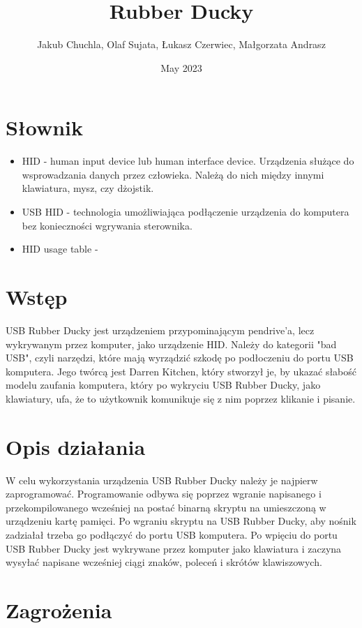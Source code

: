 \documentclass{article}
\title{Rubber Ducky}
\author{Jakub Chuchla, Olaf Sujata, Łukasz Czerwiec, Małgorzata Andrasz}
\date{May 2023}
\begin{document}
\maketitle

\tableofcontents

\section{Słownik}

\begin{itemize}
    \item HID - human input device lub human interface device. Urządzenia służące do wsprowadzania danych przez człowieka. Należą do nich między innymi klawiatura, mysz, czy dżojstik.
    \item USB HID - technologia umożliwiająca podłączenie urządzenia do komputera bez konieczności wgrywania sterownika.
    \item HID usage table - 
\end{itemize}

\section{Wstęp}

USB Rubber Ducky jest urządzeniem przypominającym pendrive'a, lecz wykrywanym przez komputer, jako urządzenie HID. Należy do kategorii "bad USB", czyli narzędzi, które mają wyrządzić szkodę po podłoczeniu do portu USB komputera. Jego twórcą jest Darren Kitchen, który stworzył je, by ukazać słabość modelu zaufania komputera, który po wykryciu USB Rubber Ducky, jako klawiatury, ufa, że to użytkownik komunikuje się z nim poprzez klikanie i pisanie.

\section{Opis działania}

W celu wykorzystania urządzenia USB Rubber Ducky należy je najpierw zaprogramować. Programowanie odbywa się poprzez wgranie napisanego i przekompilowanego wcześniej na postać binarną skryptu na umieszczoną w urządzeniu kartę pamięci. Po wgraniu skryptu na USB Rubber Ducky, aby nośnik zadziałał trzeba go podłączyć do portu USB komputera. Po wpięciu do portu USB Rubber Ducky jest wykrywane przez komputer jako klawiatura i zaczyna wysyłać napisane wcześniej ciągi znaków, poleceń i skrótów klawiszowych.

\section{Zagrożenia}
\end{document}
